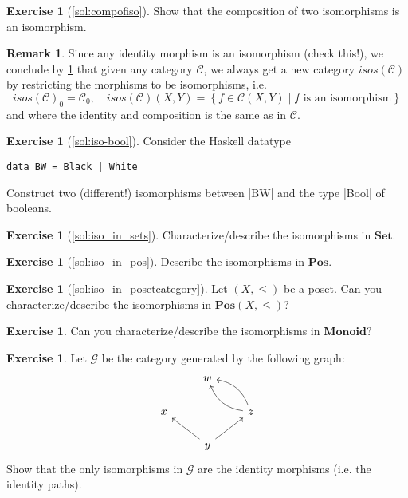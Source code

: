 \documentclass[a4paper,10pt]{scrartcl}
\theoremstyle{plain}
\theoremstyle{definition}
\newtheorem{rem}[thm]{Remark}
\newtheorem{exer}[thm]{Exercise}
\newcommand{\Cat}[1]{\mathcal{#1}}
\newcommand{\CC}{\Cat{C}}
\newcommand{\Catb}[1]{\mathbf{#1}}
\newcommand{\SET}{\Catb{Set}}
\newcommand{\POS}{\Catb{Pos}}
\newcommand{\MON}{\Catb{Monoid}}
\newcommand{\Ob}[1]{{#1}_0}
\newcommand{\CHom}[3]{{#1}(#2,#3)}
\begin{document}
\begin{exer}[\cref{sol:compofiso}]\label{exer:compofiso}
  Show that the composition of two isomorphisms is an isomorphism.
\end{exer}
\begin{rem} 
Since any identity morphism is an isomorphism (check this!), we conclude by \cref{exer:compofiso} that given any category $\CC$, we always get a new category $isos(\CC)$ by restricting the morphisms to be isomorphisms, i.e. \[
\Ob{isos(\CC)} = \Ob{\CC}, \quad \CHom{isos(\CC)}{X}{Y} = \left\{f \in \CHom{\CC}{X}{Y} \mid f \text{ is an isomorphism}\right\}
\] 
and where the identity and composition is the same as in $\CC$.
\end{rem}


\begin{exer}[\cref{sol:iso-bool}]\label{exer:iso-bool}
  Consider the Haskell datatype
\begin{lstlisting}
data BW = Black | White
\end{lstlisting}
Construct two (different!) isomorphisms between |BW| and the type |Bool| of booleans.
\end{exer}

\begin{exer}[\cref{sol:iso_in_sets}]\label{exer:iso_in_sets}
  Characterize/describe the isomorphisms in $\SET$.
\end{exer}

\begin{exer}[\cref{sol:iso_in_pos}]\label{exer:iso_in_pos}
  Describe the isomorphisms in $\POS$.
\end{exer}

\begin{exer}[\cref{sol:iso_in_posetcategory}]\label{exer:iso_in_posetcategory} Let $(X,\leq)$ be a poset. Can you characterize/describe the isomorphisms in $\POS(X,\leq)$?
\end{exer}

\begin{exer} Can you characterize/describe the isomorphisms in $\MON$?
\end{exer}

\begin{exer} Let $\mathcal{G}$ be the category generated by the following graph:
\[
\begin{tikzcd}
& w & \\
x & & z \arrow[lu, bend left] \arrow[lu,bend right] \\
& y \arrow[lu] \arrow[ru] &
\end{tikzcd}
\]
Show that the only isomorphisms in $\mathcal{G}$ are the identity morphisms (i.e. the identity paths).
\end{exer}
\end{document}
